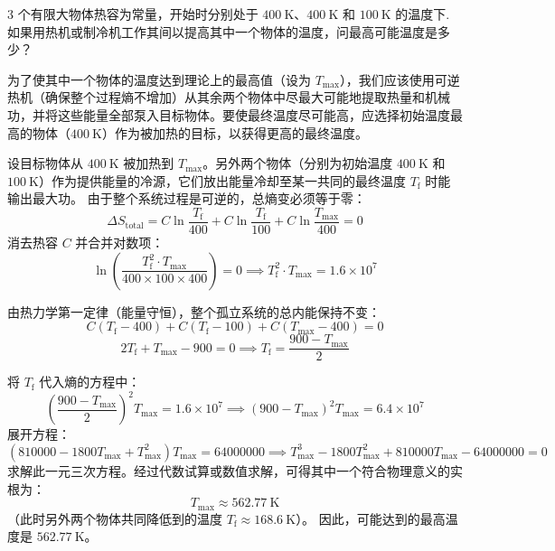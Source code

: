 \begin{exercise}\label{ex:12.5}
3 个有限大物体热容为常量，开始时分别处于 $400 \ \mathrm{K}$、$400 \ \mathrm{K}$ 和 $100 \ \mathrm{K}$ 的温度下. 如果用热机或制冷机工作其间以提高其中一个物体的温度，问最高可能温度是多少？
\end{exercise}
\begin{solution}
为了使其中一个物体的温度达到理论上的最高值（设为 $T_{\max}$），我们应该使用可逆热机（确保整个过程熵不增加）从其余两个物体中尽最大可能地提取热量和机械功，并将这些能量全部泵入目标物体。要使最终温度尽可能高，应选择初始温度最高的物体（$400 \ \mathrm{K}$）作为被加热的目标，以获得更高的最终温度。

设目标物体从 $400 \ \mathrm{K}$ 被加热到 $T_{\max}$。另外两个物体（分别为初始温度 $400 \ \mathrm{K}$ 和 $100 \ \mathrm{K}$）作为提供能量的冷源，它们放出能量冷却至某一共同的最终温度 $T_{\mathrm{f}}$ 时能输出最大功。
由于整个系统过程是可逆的，总熵变必须等于零：
$$ \Delta S_{\mathrm{total}} = C \ln\frac{T_{\mathrm{f}}}{400} + C \ln\frac{T_{\mathrm{f}}}{100} + C \ln\frac{T_{\max}}{400} = 0 $$
消去热容 $C$ 并合并对数项：
$$ \ln\left( \frac{T_{\mathrm{f}}^2 \cdot T_{\max}}{400 \times 100 \times 400} \right) = 0 \implies T_{\mathrm{f}}^2 \cdot T_{\max} = 1.6 \times 10^7 $$

由热力学第一定律（能量守恒），整个孤立系统的总内能保持不变：
$$ C(T_{\mathrm{f}} - 400) + C(T_{\mathrm{f}} - 100) + C(T_{\max} - 400) = 0 $$
$$ 2T_{\mathrm{f}} + T_{\max} - 900 = 0 \implies T_{\mathrm{f}} = \frac{900 - T_{\max}}{2} $$

将 $T_{\mathrm{f}}$ 代入熵的方程中：
$$ \left( \frac{900 - T_{\max}}{2} \right)^2 T_{\max} = 1.6 \times 10^7 \implies (900 - T_{\max})^2 T_{\max} = 6.4 \times 10^7 $$
展开方程：
$$ (810000 - 1800 T_{\max} + T_{\max}^2) T_{\max} = 64000000 \implies T_{\max}^3 - 1800 T_{\max}^2 + 810000 T_{\max} - 64000000 = 0 $$
求解此一元三次方程。经过代数试算或数值求解，可得其中一个符合物理意义的实根为：
$$ T_{\max} \approx 562.77 \ \mathrm{K} $$
（此时另外两个物体共同降低到的温度 $T_{\mathrm{f}} \approx 168.6 \ \mathrm{K}$）。
因此，可能达到的最高温度是 $562.77 \ \mathrm{K}$。
\end{solution}


